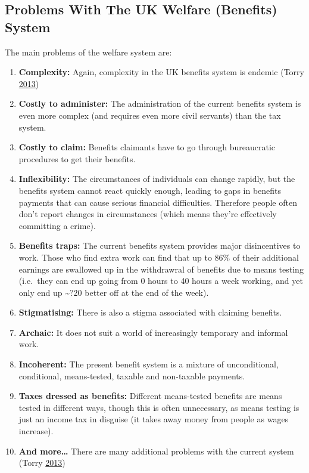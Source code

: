 \documentclass[]{tufte-handout}
\providecommand{\tightlist}{%
  \setlength{\itemsep}{0pt}\setlength{\parskip}{0pt}}
\begin{document}
\hypertarget{problems-with-the-uk-welfare-benefits-system}{%
\subsection{Problems With The UK Welfare (Benefits)
System}\label{problems-with-the-uk-welfare-benefits-system}}

The main problems of the welfare system are:

\begin{enumerate}
\def\labelenumi{\arabic{enumi}.}
\tightlist
\item
  \textbf{Complexity:} Again, complexity in the UK benefits system is
  endemic (Torry \protect\hyperlink{ref-Torry2013}{2013})
\item
  \textbf{Costly to administer:} The administration of the current
  benefits system is even more complex (and requires even more civil
  servants) than the tax system.
\item
  \textbf{Costly to claim:} Benefits claimants have to go through
  bureaucratic procedures to get their benefits.
\item
  \textbf{Inflexibility:} The circumstances of individuals can change
  rapidly, but the benefits system cannot react quickly enough, leading
  to gaps in benefits payments that can cause serious financial
  difficulties. Therefore people often don't report changes in
  circumstances (which means they're effectively committing a crime).
\item
  \textbf{Benefits traps:} The current benefits system provides major
  disincentives to work. Those who find extra work can find that up to
  86\% of their additional earnings are swallowed up in the withdrawral
  of benefits due to means testing (i.e.~they can end up going from 0
  hours to 40 hours a week working, and yet only end up
  \textasciitilde{}?20 better off at the end of the week).
\item
  \textbf{Stigmatising:} There is also a stigma associated with claiming
  benefits.
\item
  \textbf{Archaic:} It does not suit a world of increasingly temporary
  and informal work.
\item
  \textbf{Incoherent:} The present benefit system is a mixture of
  unconditional, conditional, means-tested, taxable and non-taxable
  payments.
\item
  \textbf{Taxes dressed as benefits:} Different means-tested benefits
  are means tested in different ways, though this is often unnecessary,
  as means testing is just an income tax in disguise (it takes away
  money from people as wages increase).
\item
  \textbf{And more\ldots{}} There are many additional problems with the
  current system (Torry \protect\hyperlink{ref-Torry2013}{2013})
\end{enumerate}
\end{document}

